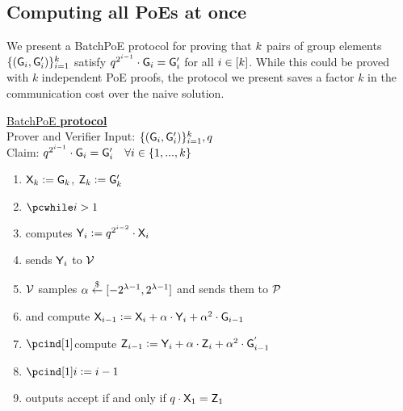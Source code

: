 \documentclass[12pt]{article}
\theoremstyle{Definition}
\begin{document}
\subsection{Computing all PoEs at once}
We present a \textsf{BatchPoE} protocol for proving that $k$ pairs of group elements $\{(\mathsf{G}_i, \mathsf{G}'_i)\}_{i=1}^k$ satisfy $q^{2^{i-1}} \cdot \mathsf{G}_i = \mathsf{G}'_i$ for all $i \in [k]$.
While this could be proved with $k$ independent PoE proofs, the protocol we present saves a factor $k$ in the communication cost over the naive solution.
\begin{mdframed}
\underline{\textsf{BatchPoE} \textbf{protocol}} \\
Prover and Verifier Input: $\{(\mathsf{G}_i,\mathsf{G}_i')\}_{i=1}^{k},q$\\
Claim: $q^{2^{i-1}}\cdot \mathsf{G}_i=\mathsf{G}'_i \quad \forall i \in \{1,...,k\}$
	\begin{enumerate}[nolistsep]
\item $\mathsf{X}_{k} \mathrel{\mathop:}= \mathsf{G}_{k}$, $\mathsf{Z}_{k} \mathrel{\mathop:}= \mathsf{G}'_{k}$
	\item $\pcwhile  i  > 1$
   \item \pcind[1]\prover computes $\mathsf{Y}_{i}\mathrel{\mathop:}= q^{2^{i-2}}\cdot \mathsf{X}_{i}$
\item\pcind[1]\prover sends $\mathsf{Y}_{i}$ to $\mathcal{V}$
	\item \pcind[1]$\mathcal{V}$ samples $\alpha \overset{\$}{\gets} [-2^{\lambda-1} ,2^{\lambda-1}]$ and sends them to $\mathcal{P}$
	\item \pcind[1]\prover and \verifier compute  $\mathsf{X}_{i-1} \mathrel{\mathop:}=  \mathsf{X}_{i}+ \alpha\cdot  \mathsf{Y}_{i}+\alpha^2 \cdot\mathsf{G}_{i-1}$
	\item $\pcind[1]$\verifier compute   $\mathsf{Z}_{i-1}\mathrel{\mathop:}= \mathsf{Y}_{i}+\alpha\cdot \mathsf{Z}_{i}+\alpha^2 \cdot \mathsf{G}_{i-1}^{'}$ 
	\item $\pcind[1] i \deq i - 1$
\item \verifier outputs \textsf{accept} if and only if $q\cdot \mathsf{X}_1=\mathsf{Z}_1$
\end{enumerate}
\end{mdframed}
\end{document}
